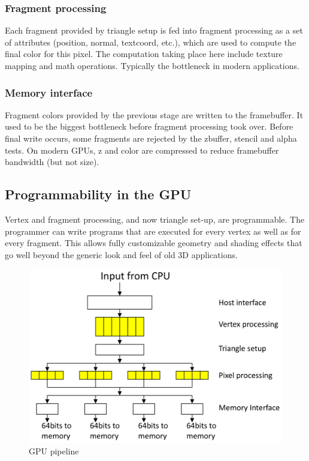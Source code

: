 \subsubsection{Fragment processing}
Each fragment provided by triangle setup is fed into fragment processing as a set of attributes (position, normal, 
textcoord, etc.), which are used to compute the final color for this pixel.
The computation taking place here include texture mapping and math operations.
Typically the bottleneck in modern applications.

\subsubsection{Memory interface}
Fragment colors provided by the previous stage are written to the framebuffer.
It used to be the biggest bottleneck before fragment processing took over.
Before final write occurs, some fragments are rejected by the zbuffer, stencil and alpha tests.
On modern GPUs, z and color are compressed to reduce framebuffer bandwidth (but not size).


\subsection{Programmability in the GPU}\label{subsec:programmability-in-the-gpu}
Vertex and fragment processing, and now triangle set-up, are programmable.
The programmer can write programs that are executed for every vertex as well as for every fragment.
This allows fully customizable geometry and shading effects that go well beyond the generic look and feel of old 3D
applications.

\begin{figure}[h]
    \centering
    \includegraphics[width=\linewidth]{images/gpu-hierarchy}
    \caption{GPU pipeline}
    \label{fig:gpu-hierarchy}
\end{figure}

